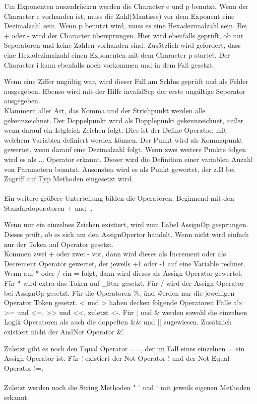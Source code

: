 Um Exponenten auszudrücken werden die Character e und p benutzt. Wenn der Character e vorhanden ist, muss die Zahl(Mantisse) vor dem Exponent eine Dezimalzahl sein. Wenn p benutzt wird, muss es eine Hexadezimalzahl sein.
Bei + oder - wird der Character übersprungen. Hier wird ebenfalls geprüft, ob nur Seperatoren und keine Zahlen vorhanden sind. Zusätzlich wird gefordert, dass eine Hexadezimalzahl einen Exponenten mit dem Character p startet. Der Character i kann ebenfalls noch vorkommen und in dem Fall gesetzt. 

Wenn eine Ziffer ungültig war, wird dieser Fall am Schlus geprüft und als Fehler ausgegeben. Ebenso wird mit der Hilfe invalidSep der erste ungültige Seperator ausgegeben. \\
Klammern aller Art, das Komma und der Strichpunkt werden alle gekennzeichnet.
Der Doppelpunkt wird als Dopplepunkt gekennzeichnet, außer wenn darauf ein Istgleich Zeichen folgt. Dies ist der Define Operator, mit welchem Variablen definiert werden können.
Der Punkt wird als Kommapunkt gewertet, wenn darauf eine Dezimalzahl folgt. Wenn zwei weitere Punkte folgen wird es als ... Operator erkannt. Dieser wird die Definition einer variablen Anzahl von Parametern benutzt. Ansonsten wird es als Punkt gewertet, der z.B bei Zugriff auf Typ Methoden eingesetzt wird.\\
\\ Ein weitere größere Unterteilung bilden die Operatoren. Beginnend mit den Standardoperatoren + und -.

Wenn nur ein einzelnes Zeichen existiert, wird zum Label AssignOp gesprungen.
Dieses prüft, ob es sich um den AssignOpertor handelt. Wenn nicht wird einfach nur der Token auf Operator gesetzt.\\
Kommen zwei + oder zwei - vor, dann wird dieses als Increment oder als Decrement Operator gewertet, der jeweils +1 oder -1 auf eine Variable rechnet.
Wenn auf * oder / ein = folgt, dann wird dieses als Assign Operator gewertet. Für * wird extra das Token auf \_Star gesetzt. Für / wird der Assign Operator bei AssignOp gesetzt.
Für die Operatoren \%, \^ und \~ werden nur die jeweiligen Operator Token gesetzt.
< und > haben decken folgende Operatoren Fälle ab: >= und <=, >> und <<, zuletzt <-. 
Für | und \& werden sowohl die einzelnen Logik Operatoren als auch die doppelten \&\& und || zugewiesen. Zusätzlich existiert nicht der AndNot Operator \&\^.

Zuletzt gibt es noch den Equal Operator ==, der im Fall eines einzelnen = ein Assign Operator ist. Für ! existiert der Not Operator ! und der Not Equal Operator !=. \\
\\ Zuletzt werden noch die String Methoden " ' und ` mit jeweils eigenen Methoden erkannt.

